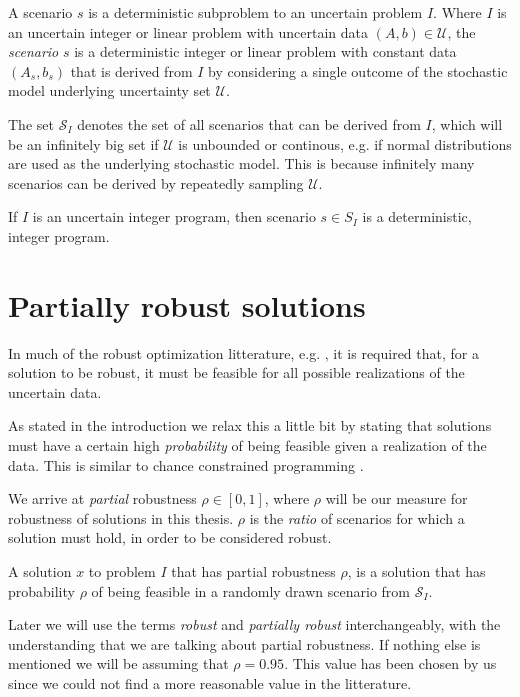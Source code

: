 A scenario $s$ is a deterministic subproblem to an uncertain problem
$I$. Where $I$ is an uncertain integer or linear problem with
uncertain data $(A,b) \in \mathcal{U}$, the \emph{scenario} $s$ is a
deterministic integer or linear problem with constant data $(A_s,
b_s)$ that is derived from $I$ by considering a single outcome of the
stochastic model underlying uncertainty set $\mathcal{U}$.

The set $\mathcal{S}_I$ denotes the set of all scenarios that can be
derived from $I$, which will be an infinitely big set if $\mathcal{U}$
is unbounded or continous, e.g. if normal distributions are used as
the underlying stochastic model. This is because infinitely many
scenarios can be derived by repeatedly sampling $\mathcal{U}$.

If $I$ is an uncertain integer program, then scenario $s \in S_I$ is a
deterministic, integer program.

\section{Partially robust solutions}
\label{sec:robustness}
In much of the robust optimization litterature, e.g. \cite{bental}, it is
required that, for a solution to be robust, it must be feasible for all
possible realizations of the uncertain data.

As stated in the introduction we relax this a little bit by stating
that solutions must have a certain high \emph{probability} of being
feasible given a realization of the data. This is similar to chance
constrained programming \cite{kallwallace}.

We arrive at \emph{partial} robustness $\rho \in [0,1]$, where $\rho$ will be
our measure for robustness of solutions in this thesis. $\rho$ is the
\emph{ratio} of scenarios for which a solution must hold, in order to be
considered robust.

\begin{definition}
\label{def:robustness}
A solution $x$ to problem $I$ that has partial robustness $\rho$, is a solution that has probability $\rho$ of being feasible in
a randomly drawn scenario from $\mathcal{S}_I$.
\end{definition}

Later we will use the terms \emph{robust} and \emph{partially robust}
interchangeably, with the understanding that we are talking about
partial robustness. If nothing else is mentioned we will be assuming
that $\rho = 0.95$. This value has been chosen by us since we could
not find a more reasonable value in the litterature.

